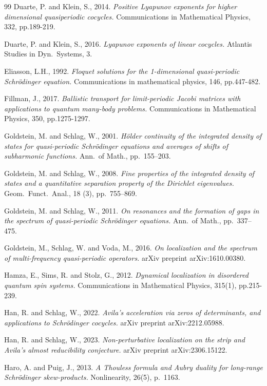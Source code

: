 \documentclass[11pt]{amsart}
\begin{document}
\begin{thebibliography}{99}
 Duarte, P. and Klein, S., 2014. {\em Positive Lyapunov exponents for higher dimensional quasiperiodic cocycles.} Communications in Mathematical Physics, 332, pp.189-219.

 Duarte, P. and Klein, S., 2016. {\em Lyapunov exponents of linear cocycles.} Atlantis Studies in Dyn.\ Systems, 3.

 Eliasson, L.H., 1992. {\em Floquet solutions for the 1-dimensional quasi-periodic Schr\"odinger equation.} Communications in mathematical physics, 146, pp.447-482.

Fillman, J., 2017. {\em Ballistic transport for limit-periodic Jacobi matrices with applications to quantum many-body problems.} Communications in Mathematical Physics, 350, pp.1275-1297.

 Goldstein, M. and Schlag, W., 2001. {\em H\"older continuity of the integrated density of states for quasi-periodic Schr\"odinger equations and averages of shifts of subharmonic functions.} Ann.\ of Math., pp.~155--203.

 Goldstein, M. and Schlag, W., 2008. {\em Fine properties of the integrated density of states and a quantitative separation property of the Dirichlet eigenvalues.} Geom.\ Funct.\ Anal., 18 (3), pp.~755--869.

 Goldstein, M. and Schlag, W., 2011. {\em On resonances and the formation of gaps in the spectrum of quasi-periodic Schr\"odinger equations.} Ann.\ of Math., pp.~337--475.

 Goldstein, M., Schlag, W. and Voda, M., 2016. {\em On localization and the spectrum of multi-frequency quasi-periodic operators.} arXiv preprint arXiv:1610.00380.

 Hamza, E., Sims, R. and Stolz, G., 2012. {\em Dynamical localization in disordered quantum spin systems.} Communications in Mathematical Physics, 315(1), pp.215-239.

 Han, R. and Schlag, W., 2022. {\em Avila's acceleration via zeros of determinants, and applications to Schr\" odinger cocycles.} arXiv preprint arXiv:2212.05988.

 Han, R. and Schlag, W., 2023. {\em Non-perturbative localization on the strip and Avila's almost reducibility conjecture.} arXiv preprint arXiv:2306.15122.

 Haro, A. and Puig, J., 2013. {\em A Thouless formula and Aubry duality for long-range Schr\"odinger skew-products.} Nonlinearity, 26(5), p.~1163.


\end{thebibliography}
\end{document}
